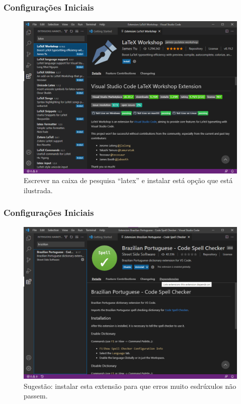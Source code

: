 \documentclass[brazilian]{beamer}
\begin{document}
\begin{frame}
    \frametitle{Configurações Iniciais}
    \begin{figure}[h]
        \centering
        \caption{Extensão para arquivos \LaTeX.}
        \label{fig:LaTeX_Workshop}
        \includegraphics[width=0.8\textheight]{../images/LaTeX_Workshop.png}
        \caption*{\footnotesize Escrever na caixa de pesquisa ``latex'' e instalar está opção que está ilustrada.}
    \end{figure}
\end{frame}

\begin{frame}
    \frametitle{Configurações Iniciais}
    \begin{figure}[h]
        \centering
        \caption{Extensão para corrigir os erros de Português (BR).}
        \label{fig:brazilian_portuguese_spell-checker}
        \includegraphics[width=0.8\textheight]{../images/brazilian_portuguese_spell-checker.png}
        \caption*{\footnotesize Sugestão: instalar esta extensão para que erros muito esdrúxulos não passem.}
    \end{figure}
\end{frame}
\end{document}
